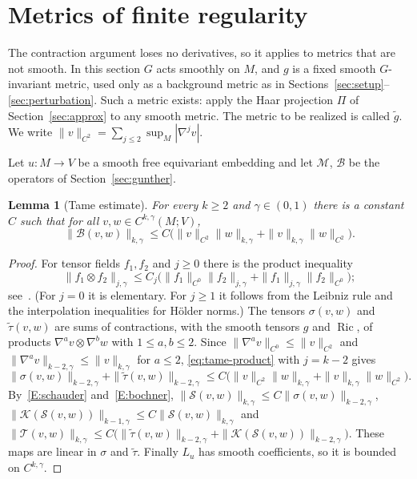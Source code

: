 \documentclass[11pt]{amsart}
\newtheorem{lemma}[theorem]{Lemma}
\theoremstyle{definition}
\newcommand{\Ric}{\operatorname{Ric}}
\newcommand{\cM}{\mathcal{M}}
\newcommand{\cB}{\mathcal{B}}
\newcommand{\cS}{\mathcal{S}}
\newcommand{\cT}{\mathcal{T}}
\newcommand{\cK}{\mathcal{K}}
\begin{document}
\section{Metrics of finite regularity}\label{sec:finite}

The contraction argument loses no derivatives, so it applies to metrics that are not smooth. In
this section $G$ acts smoothly on $M$, and $g$ is a fixed smooth $G$-invariant metric, used only as
a background metric as in Sections~\ref{sec:setup}--\ref{sec:perturbation}. Such a metric exists:
apply the Haar projection $\Pi$ of Section~\ref{sec:approx} to any smooth metric. The metric to be
realized is called $\tilde g$. We write $\|v\|_{C^2}=\sum_{j\le2}\sup_M|\nabla^jv|$.

Let $u\colon M\to V$ be a smooth free equivariant embedding and let $\cM$, $\cB$ be the operators
of Section~\ref{sec:gunther}.

\begin{lemma}[Tame estimate]\label{lem:tame}
For every $k\ge2$ and $\gamma\in(0,1)$ there is a constant $C$ such that for all
$v,w\in C^{k,\gamma}(M;V)$,
\[
\|\cB(v,w)\|_{k,\gamma}\le C\bigl(\|v\|_{C^2}\|w\|_{k,\gamma}+\|v\|_{k,\gamma}\|w\|_{C^2}\bigr).
\]
\end{lemma}

\begin{proof}
For tensor fields $f_1,f_2$ and $j\ge0$ there is the product inequality
\begin{equation}\label{eq:tame-product}
\|f_1\otimes f_2\|_{j,\gamma}\le C_j\bigl(\|f_1\|_{C^0}\|f_2\|_{j,\gamma}+\|f_1\|_{j,\gamma}\|f_2\|_{C^0}\bigr);
\end{equation}
see~\cite[Appendix~A]{Hormander76}. (For $j=0$ it is elementary. For $j\ge1$ it follows from the
Leibniz rule and the interpolation inequalities for H\"older norms.) The tensors $\sigma(v,w)$ and
$\tilde\tau(v,w)$ are sums of contractions, with the smooth tensors $g$ and $\Ric$, of products
$\nabla^av\otimes\nabla^bw$ with $1\le a,b\le2$. Since $\|\nabla^av\|_{C^0}\le\|v\|_{C^2}$ and
$\|\nabla^av\|_{k-2,\gamma}\le\|v\|_{k,\gamma}$ for $a\le2$, \eqref{eq:tame-product} with $j=k-2$
gives
\[
\|\sigma(v,w)\|_{k-2,\gamma}+\|\tilde\tau(v,w)\|_{k-2,\gamma}
\le C\bigl(\|v\|_{C^2}\|w\|_{k,\gamma}+\|v\|_{k,\gamma}\|w\|_{C^2}\bigr).
\]
By~\ref{E:schauder} and~\ref{E:bochner}, $\|\cS(v,w)\|_{k,\gamma}\le C\|\sigma(v,w)\|_{k-2,\gamma}$,
$\|\cK(\cS(v,w))\|_{k-1,\gamma}\le C\|\cS(v,w)\|_{k,\gamma}$ and
$\|\cT(v,w)\|_{k,\gamma}\le C\bigl(\|\tilde\tau(v,w)\|_{k-2,\gamma}+\|\cK(\cS(v,w))\|_{k-2,\gamma}\bigr)$.
These maps are linear in $\sigma$ and $\tilde\tau$. Finally $L_u$ has smooth coefficients, so it is
bounded on $C^{k,\gamma}$.
\end{proof}
\end{document}
